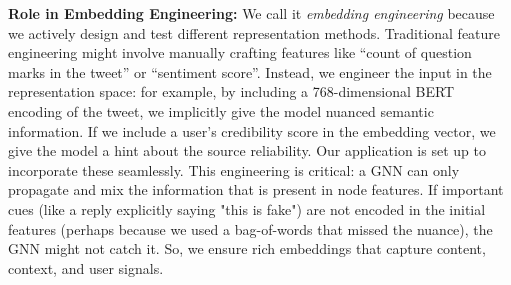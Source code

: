 \documentclass[12pt,a4paper]{report}
\begin{document}
\textbf{Role in Embedding Engineering:} We call it \textit{embedding engineering} because we actively design and test different representation methods. Traditional feature engineering might involve manually crafting features like “count of question marks in the tweet” or “sentiment score”. Instead, we engineer the input in the representation space: for example, by including a 768-dimensional BERT encoding of the tweet, we implicitly give the model nuanced semantic information. If we include a user’s credibility score in the embedding vector, we give the model a hint about the source reliability. Our application is set up to incorporate these seamlessly. This engineering is critical: a GNN can only propagate and mix the information that is present in node features. If important cues (like a reply explicitly saying "this is fake") are not encoded in the initial features (perhaps because we used a bag-of-words that missed the nuance), the GNN might not catch it. So, we ensure rich embeddings that capture content, context, and user signals.
\end{document}
